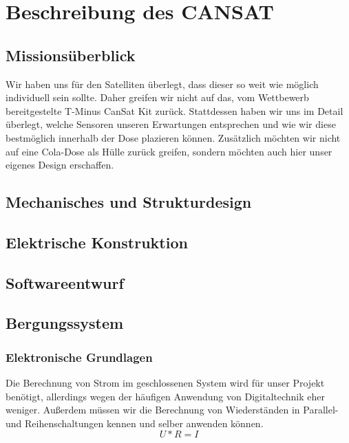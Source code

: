 \section{Beschreibung des CANSAT}


\subsection{Missionsüberblick}
Wir haben uns für den Satelliten überlegt, dass dieser so weit wie möglich individuell sein sollte. Daher greifen wir nicht auf das, vom Wettbewerb bereitgestelte T-Minus CanSat Kit zurück. Stattdessen haben wir uns im Detail überlegt, welche Sensoren unseren Erwartungen entsprechen und wie wir diese bestmöglich innerhalb der Dose plazieren können. Zusätzlich möchten wir nicht auf eine Cola-Dose als Hülle zurück greifen, sondern möchten auch hier unser eigenes Design erschaffen.


\subsection{Mechanisches und Strukturdesign}

\subsection{Elektrische Konstruktion}

\subsection{Softwareentwurf}

\subsection{Bergungssystem}






\subsubsection{Elektronische Grundlagen}
Die Berechnung von Strom im geschlossenen System wird für unser Projekt benötigt, allerdings wegen der häufigen Anwendung von Digitaltechnik eher weniger. Außerdem müssen wir die Berechnung von Wiederständen in Parallel- und Reihenschaltungen kennen und selber anwenden können.
\[
U * R = I
\]

